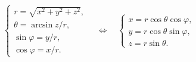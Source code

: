 \begin{equation}
    \begin{cases}
        r = \sqrt{x^2 + y^2 + z^2},\\
        \theta = \arcsin{z/r},\\
        \sin \varphi = y/r,\\
        \cos \varphi = x/r.
    \end{cases}
    \quad \Leftrightarrow \quad
    \begin{cases}
        x = r \cos \theta \cos \varphi    ,\\
        y = r \cos \theta \sin \varphi,\\
        z = r \sin \theta.
    \end{cases}
\end{equation}
